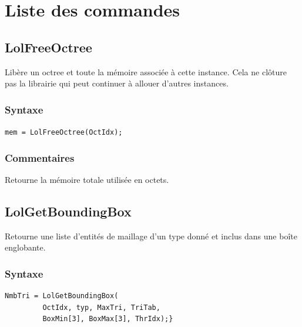 \documentclass[a4paper,12pt]{article}
\begin{document}
\clearpage
\section{Liste des commandes}


\subsection{LolFreeOctree}
Libère un octree et toute la mémoire associée à cette instance. Cela ne clôture pas la librairie qui peut continuer à allouer d'autres instances.

\subsubsection*{Syntaxe}
{\tt mem = LolFreeOctree(OctIdx);}

\subsubsection*{Commentaires}
Retourne la mémoire totale utilisée en octets.


\subsection{LolGetBoundingBox}
Retourne une liste d'entités de maillage d'un type donné et inclus dans une boîte englobante.

\subsubsection*{Syntaxe}
\begin{tt}
\begin{verbatim}
NmbTri = LolGetBoundingBox(
         OctIdx, typ, MaxTri, TriTab,
         BoxMin[3], BoxMax[3], ThrIdx);}
\end{verbatim}
\end{tt}
\normalfont
\end{document}
